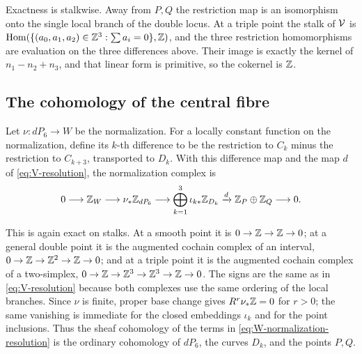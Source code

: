 Exactness is stalkwise.  Away from $P,Q$ the restriction map is an
isomorphism onto the single local branch of the double locus.  At a triple
point the stalk of $\mathcal V$ is
$\operatorname{Hom}(\{(a_0,a_1,a_2)\in\mathbb Z^3:\sum a_i=0\},\mathbb Z)$, and the three
restriction homomorphisms are evaluation on the three differences above.
Their image is exactly the kernel of $n_1-n_2+n_3$, and that linear form
is primitive, so the cokernel is $\mathbb Z$.

\subsection{The cohomology of the central fibre}
Let $\nu:dP_6\to W$ be the normalization.  For a locally constant
function on the normalization, define its $k$-th difference to be the
restriction to $C_k$ minus the restriction to $C_{k+3}$, transported to
$D_k$.  With this difference map and the map $d$ of
\eqref{eq:V-resolution}, the normalization complex is
\begin{equation}\label{eq:W-normalization-resolution}
 0\longrightarrow\mathbb Z_W\longrightarrow\nu_*\mathbb Z_{dP_6}
 \longrightarrow\bigoplus_{k=1}^3\iota_{k*}\mathbb Z_{D_k}
 \xrightarrow{d}\mathbb Z_P\oplus\mathbb Z_Q\longrightarrow0.
\end{equation}

This is again exact on stalks.  At a smooth point it is
$0\to\mathbb Z\to\mathbb Z\to0$; at a general double point it is the augmented
cochain complex of an interval,
$0\to\mathbb Z\to\mathbb Z^2\to\mathbb Z\to0$; and at a triple point it is the
augmented cochain complex of a two-simplex,
$0\to\mathbb Z\to\mathbb Z^3\to\mathbb Z^3\to\mathbb Z\to0$.
The signs are the same as in \eqref{eq:V-resolution} because both
complexes use the same ordering of the local branches.  Since $\nu$ is
finite, proper base change gives $R^r\nu_*\mathbb Z=0$ for $r>0$; the same
vanishing is immediate for the closed embeddings $\iota_k$ and for the
point inclusions.  Thus the sheaf cohomology of the terms in
\eqref{eq:W-normalization-resolution} is the ordinary cohomology of
$dP_6$, the curves $D_k$, and the points $P,Q$.


